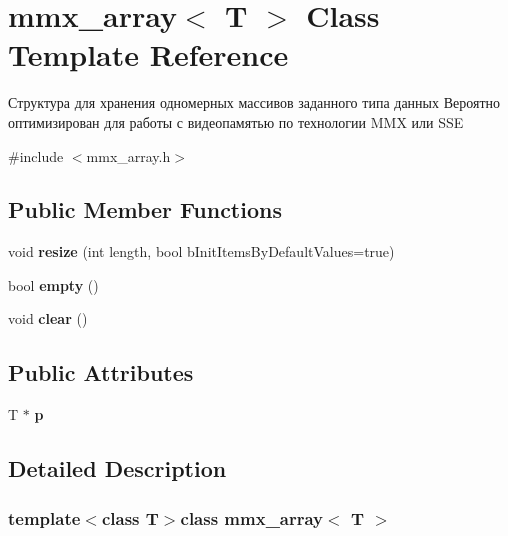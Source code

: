 \hypertarget{classmmx__array}{\section{mmx\+\_\+array$<$ T $>$ Class Template Reference}
\label{classmmx__array}
}


Структура для хранения одномерных массивов заданного типа данных Вероятно оптимизирован для работы с видеопамятью по технологии M\+M\+X или S\+S\+E  




{\ttfamily \#include $<$mmx\+\_\+array.\+h$>$}

\subsection*{Public Member Functions}
\begin{DoxyCompactItemize}
\item 
\hypertarget{classmmx__array_a1e2391d51dfe090e9bd0a9bd5368d512}{void {\bfseries resize} (int length, bool b\+Init\+Items\+By\+Default\+Values=true)}\label{classmmx__array_a1e2391d51dfe090e9bd0a9bd5368d512}

\item 
\hypertarget{classmmx__array_ad16d7bd1ebebc364a791f011d2d5f9d1}{bool {\bfseries empty} ()}\label{classmmx__array_ad16d7bd1ebebc364a791f011d2d5f9d1}

\item 
\hypertarget{classmmx__array_a5da7e05a539fbfb916289d32ae540a9e}{void {\bfseries clear} ()}\label{classmmx__array_a5da7e05a539fbfb916289d32ae540a9e}

\end{DoxyCompactItemize}
\subsection*{Public Attributes}
\begin{DoxyCompactItemize}
\item 
\hypertarget{classmmx__array_ad960c2e84c1717258f9c9527b0d339b2}{T $\ast$ {\bfseries p}}\label{classmmx__array_ad960c2e84c1717258f9c9527b0d339b2}

\end{DoxyCompactItemize}


\subsection{Detailed Description}
\subsubsection*{template$<$class T$>$class mmx\+\_\+array$<$ T $>$}


